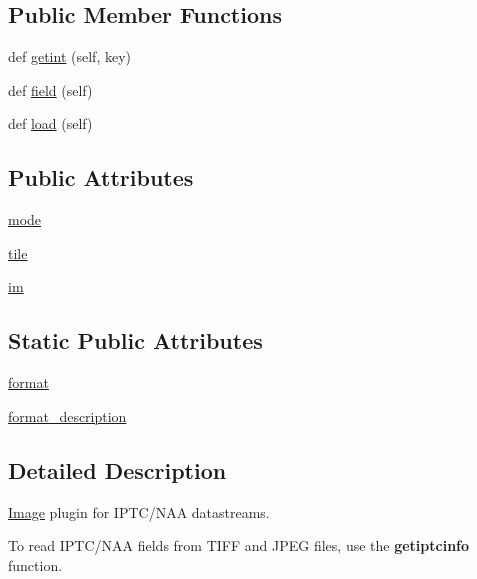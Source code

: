 \subsection*{Public Member Functions}
\begin{DoxyCompactItemize}
\item 
def \hyperlink{classPIL_1_1IptcImagePlugin_1_1IptcImageFile_aeffd4b4e8cc294e1ec10cec7a4646592}{getint} (self, key)
\item 
def \hyperlink{classPIL_1_1IptcImagePlugin_1_1IptcImageFile_a669956a944561941c6145548f4673a9f}{field} (self)
\item 
def \hyperlink{classPIL_1_1IptcImagePlugin_1_1IptcImageFile_a21088b517f434d2e5b72bccce94021d4}{load} (self)
\end{DoxyCompactItemize}
\subsection*{Public Attributes}
\begin{DoxyCompactItemize}
\item 
\hyperlink{classPIL_1_1IptcImagePlugin_1_1IptcImageFile_a1041438eb0826e2b6298421a007804e0}{mode}
\item 
\hyperlink{classPIL_1_1IptcImagePlugin_1_1IptcImageFile_ab9da8472fb7e7f0324f9203ace73a2b6}{tile}
\item 
\hyperlink{classPIL_1_1IptcImagePlugin_1_1IptcImageFile_a5f66f293d5fbd6a952c1513fbefe13e7}{im}
\end{DoxyCompactItemize}
\subsection*{Static Public Attributes}
\begin{DoxyCompactItemize}
\item 
\hyperlink{classPIL_1_1IptcImagePlugin_1_1IptcImageFile_a9a0843c9b32be2300eed99d7230e6a92}{format}
\item 
\hyperlink{classPIL_1_1IptcImagePlugin_1_1IptcImageFile_a27a5af9516d435442abfb35653632d26}{format\+\_\+description}
\end{DoxyCompactItemize}


\subsection{Detailed Description}
\hyperlink{namespacePIL_1_1Image}{Image} plugin for I\+P\+T\+C/\+N\+AA datastreams. 

To read I\+P\+T\+C/\+N\+AA fields from T\+I\+FF and J\+P\+EG files, use the {\bfseries getiptcinfo} function. 

